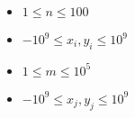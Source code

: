 \begin{itemize}
	\tightlist
	\item $1 \leq n \leq 100$
    \item $-10^9 \leq x_i,y_i \leq 10^9$
    \item $1 \leq m \leq 10^5$
    \item $-10^9 \leq x_j,y_j \leq 10^9$
\end{itemize}

